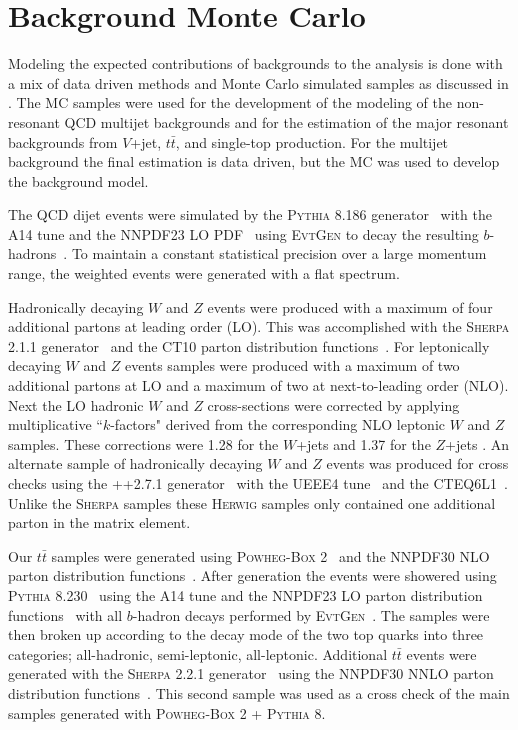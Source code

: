 \section{Background Monte Carlo} \label{sec:data:bkg_mc}

Modeling the expected contributions of backgrounds to the analysis is done with
a mix of data driven methods and Monte Carlo simulated samples as discussed in
.  The MC samples were used for the development of the
modeling of the non-resonant QCD multijet backgrounds and for the estimation
of the major resonant backgrounds from $V$+jet, $t\bar{t}$, and single-top
production.  For the multijet background the final estimation is data driven,
but the MC was used to develop the background model.

The QCD dijet events were simulated by the \textsc{Pythia} 8.186
generator~\cite{Sjostrand:2007gs} with the A14 tune and the NNPDF23 LO
PDF~\cite{Carrazza:2013axa} using \textsc{EvtGen} to decay the resulting
$b$-hadrons~\cite{LANGE2001152}.  To maintain a constant statistical precision
over a large momentum range, the weighted events were generated with a flat \pT
spectrum.

Hadronically decaying $W$ and $Z$ events were produced with a maximum of four
additional partons at leading order (LO).  This was accomplished with the
\textsc{Sherpa} 2.1.1 generator~\cite{Gleisberg:2008ta} and the CT10 parton
distribution functions~\cite{Lai:2010vv}.  For leptonically decaying $W$ and
$Z$ events samples were produced with a maximum of two additional partons at LO
and a maximum of two at next-to-leading order (NLO).  Next the LO hadronic $W$
and $Z$ cross-sections were corrected by applying multiplicative ``$k$-factors"
derived from the corresponding NLO leptonic $W$ and $Z$ samples.  These corrections
were 1.28 for the $W$+jets and 1.37 for the $Z$+jets \cite{Aaboud:2018zba}. An
alternate sample of hadronically decaying $W$ and $Z$ events was produced for
cross checks using the ++2.7.1 generator~\cite{Bahr:2008pv} with
the UEEE4 tune~\cite{Buckley:2018wdv} and the CTEQ6L1~\cite{Pumplin:2002vw}.
Unlike the \textsc{Sherpa} samples these \textsc{Herwig} samples only contained
one additional parton in the matrix element.

Our $t\bar{t}$ samples were generated using \textsc{Powheg-Box}
2~\cite{Campbell2012} and the NNPDF30 NLO parton distribution
functions~\cite{Ball:2014uwa}. After generation the events were showered using
\textsc{Pythia} 8.230~\cite{Sjostrand:2014zea} using the A14 tune and the
NNPDF23 LO parton distribution functions~\cite{Carrazza:2013axa} with all
$b$-hadron decays performed by \textsc{EvtGen}~\cite{LANGE2001152}.  The
samples were then broken up according to the decay mode of the two top quarks
into three categories; all-hadronic, semi-leptonic, all-leptonic. Additional
$t\bar{t}$ events were generated with the \textsc{Sherpa} 2.2.1
generator~\cite{Gleisberg:2008ta} using the NNPDF30 NNLO parton distribution
functions~\cite{Ball:2014uwa}.  This second sample was used as a cross check of
the main samples generated with \textsc{Powheg-Box} 2 + \textsc{Pythia} 8.

